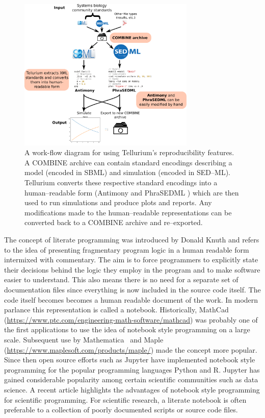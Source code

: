 \documentclass[10pt,letterpaper]{article}
\begin{document}
\begin{figure}
  \includegraphics[width=0.75\textwidth]{fig-workflow.pdf}
  \caption{A work-flow diagram for using Tellurium's reproducibility features. A COMBINE archive can contain standard encodings describing a model (encoded in SBML) and simulation (encoded in SED--ML). Tellurium converts these respective standard encodings into a human--readable form (Antimony \cite{smith2009antimony} and PhraSEDML \cite{choi2016phrased}) which are then used to run simulations and produce plots and reports. Any modifications made to the human--readable representations can be converted back to a COMBINE archive and re--exported.}
  \label{fig:workflow}
\end{figure}

The concept of literate programming was introduced by Donald Knuth \cite{knuth84literate} and refers to the idea of presenting fragmentary program logic in a human readable form intermixed with commentary. The aim is to force programmers to explicitly state their decisions behind the logic they employ in the program and to make software easier to understand. This also means there is no need for a separate set of documentation files since everything is now included in the source code itself. The code itself becomes becomes a human readable document of the work. In modern parlance this representation is called a notebook. Historically, MathCad (\url{https://www.ptc.com/engineering-math-software/mathcad}) was probably one of the first applications to use the idea of notebook style programming on a large scale. Subsequent use by Mathematica~\cite{wolfram1996mathematica} and Maple (\url{https://www.maplesoft.com/products/maple/}) made the concept more popular. Since then open source efforts such as Jupyter \cite{ragan2014jupyter} have implemented notebook style programming for the popular programming languages Python and R. Jupyter has gained considerable popularity among certain scientific communities such as data science. A recent article highlights the advantages of notebook style programming \cite{shen2014interactive} for scientific programming. For scientific research, a literate notebook is often preferable to a collection of poorly documented scripts or source code files.
\end{document}
